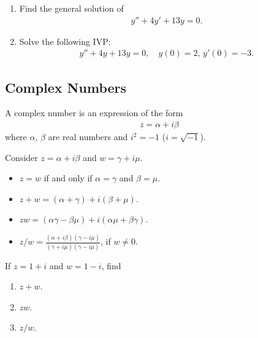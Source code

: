 \documentclass[12pt,a4paper]{article}
\newcounter{example}[section]
\begin{document}
	\begin{example}
	\begin{enumerate}[label=\alph*)]
	\item Find the general solution of
		\begin{align*}
		y'' + 4y' + 13y = 0 .
		\end{align*}
	\item Solve the following IVP:
		\begin{align*}
		y'' + 4y + 13y = 0 , \quad y (0) = 2 , \, y' (0) = -3 .
		\end{align*}
	\end{enumerate}
	\end{example}
	
	\vfill

	\subsection{Complex Numbers}
	A complex number is an expression of the form
		\begin{align*}
		z = \alpha + i \beta
		\end{align*}
	where $\alpha$, $\beta$ are real numbers and $i^2 = -1$ ($i = \sqrt{-1}$). 
	
	Consider $z = \alpha + i \beta$ and $w = \gamma + i \mu$.
	\begin{multicols}{2}
		\begin{itemize}
		\item $z = w$ if and only if $\alpha = \gamma$ and $\beta = \mu$.
		\item $z + w = (\alpha + \gamma ) + i (\beta + \mu )$.
		\item $zw = (\alpha \gamma - \beta \mu ) + i (\alpha \mu + \beta \gamma )$.
		\item $z/w = \frac{(\alpha + i \beta) (\gamma - i \mu )}{(\gamma + i \mu) (\gamma - i \mu )}$, if $w \neq 0$.
		\end{itemize}
	\end{multicols}
	
	\begin{example}
	If $z = 1 + i$ and $w = 1 - i$, find
	\begin{multicols}{3}
		\begin{enumerate}[label=\alph*)]
		\item $z + w$.
		\item $zw$.
		\item $z/w$.
		\end{enumerate}
	\end{multicols}
	\end{example}
	
\end{document}
